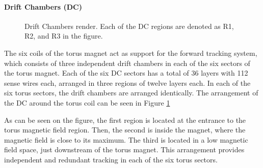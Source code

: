 \paragraph{Drift Chambers (DC)}
    \begin{figure}
        \centering{}
        \caption[DC]{Drift Chambers render.
        Each of the DC regions are denoted as R1, R2, and R3 in the figure.}
        \label{fig::dc}
    \end{figure}

    The six coils of the torus magnet act as support for the forward tracking system, which consists of three independent drift chambers in each of the six sectors of the torus magnet.
    Each of the six DC sectors has a total of 36 layers with 112 sense wires each, arranged in three regions of twelve layers each.
    In each of the six torus sectors, the drift chambers are arranged identically.
    The arrangement of the DC around the torus coil can be seen in Figure \ref{fig::dc}

    As can be seen on the figure, the first region is located at the entrance to the torus magnetic field region.
    Then, the second is inside the magnet, where the magnetic field is close to its maximum.
    The third is located in a low magnetic field space, just downstream of the torus magnet. 
    This arrangement provides independent and redundant tracking in each of the six torus sectors.


